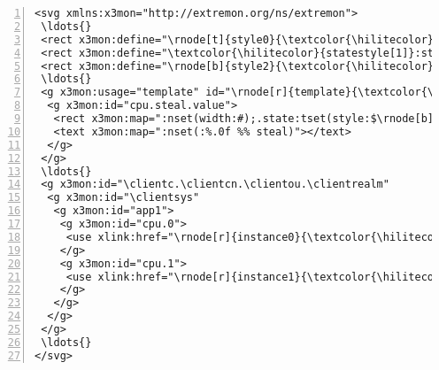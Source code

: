\documentclass[10pt]{article}
\begin{document}
\begin{Verbatim}[numbers=left,numbersep=6pt,fontsize=\small,commandchars=\\\{\}]
<svg xmlns:x3mon="http://extremon.org/ns/extremon">
 \ldots{} 
 <rect x3mon:define="\rnode[t]{style0}{\textcolor{\hilitecolor}{statestyle[0]}}:style" style="\rnode[t]{style}{\textcolor{\hilitecolor}{fill:#79ffb3;}}"/>
 <rect x3mon:define="\textcolor{\hilitecolor}{statestyle[1]}:style" style="fill:#ffff00;"/>
 <rect x3mon:define="\rnode[b]{style2}{\textcolor{\hilitecolor}{statestyle[2]}}:style" style="fill:#ff0000;"/>
 \ldots{}
 <g x3mon:usage="template" id="\rnode[r]{template}{\textcolor{\hilitecolor}{x3mon-cpu-core}}">
  <g x3mon:id="cpu.steal.value">
   <rect x3mon:map=":nset(width:#);.state:tset(style:$\rnode[b]{styleN}{\textcolor{\hilitecolor}{statestyle[#]}})" width="20" style="\ldots{}
   <text x3mon:map=":nset(:%.0f %% steal)"></text> 
  </g>
 </g>
 \ldots{}
 <g x3mon:id="\clientc.\clientcn.\clientou.\clientrealm"
  <g x3mon:id="\clientsys"
   <g x3mon:id="app1">
    <g x3mon:id="cpu.0">
     <use xlink:href="\rnode[r]{instance0}{\textcolor{\hilitecolor}{#x3mon-cpu-core}}"/>
    </g>
    <g x3mon:id="cpu.1">
     <use xlink:href="\rnode[r]{instance1}{\textcolor{\hilitecolor}{#x3mon-cpu-core}}"/>
    </g>
   </g>
  </g>
 </g>
 \ldots{} 
</svg>
\end{Verbatim}

\end{document}
